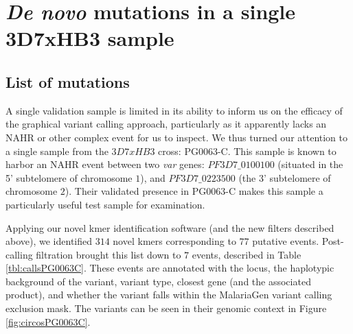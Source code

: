 \section{\textit{De novo} mutations in a single 3D7xHB3 sample}

\subsection{List of mutations}

A single validation sample is limited in its ability to inform us on the efficacy of the graphical variant calling approach, particularly as it apparently lacks an NAHR or other complex event for us to inspect.  We thus turned our attention to a single sample from the $3D7xHB3$ cross: PG0063-C.  This sample is known to harbor an NAHR event between two \textit{var} genes: $PF3D7\_0100100$ (situated in the 5' subtelomere of chromosome $1$), and $PF3D7\_0223500$ (the 3' subtelomere of chromosome $2$).  Their validated presence in PG0063-C makes this sample a particularly useful test sample for examination.

Applying our novel kmer identification software (and the new filters described above), we identified $314$ novel kmers corresponding to $77$ putative events.  Post-calling filtration brought this list down to $7$ events, described in Table \ref{tbl:callsPG0063C}.  These events are annotated with the locus, the haplotypic background of the variant, variant type, closest gene (and the associated product), and whether the variant falls within the MalariaGen variant calling exclusion mask.  The variants can be seen in their genomic context in Figure \ref{fig:circosPG0063C}.  

